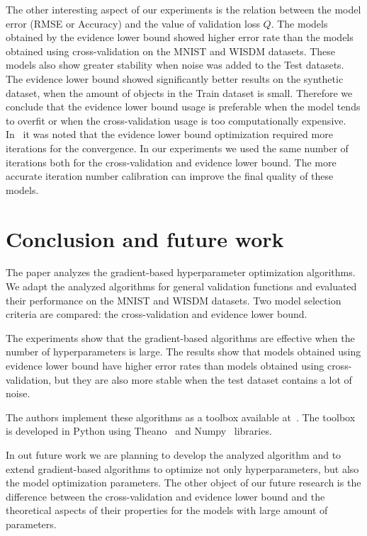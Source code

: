 \documentclass[smallcondensed]{svjour3}
\begin{document}
The other interesting aspect of our experiments is the relation between the model error (RMSE or Accuracy) and the value of validation loss $Q$. The models obtained by the evidence lower bound showed higher error rate than the models obtained using cross-validation on the MNIST and WISDM datasets. These models also show greater stability when noise was added to the Test datasets.  The evidence lower bound showed significantly better results on the synthetic dataset, when the amount of objects in the Train dataset is small. Therefore we conclude that the evidence lower bound usage is preferable when the model tends to overfit or when the cross-validation usage is too computationally expensive.   In~\cite{nips} it was noted that the evidence lower bound optimization required more iterations for the convergence. In our experiments we used the same number of iterations both for the cross-validation and evidence lower bound. The more accurate iteration number calibration can improve the final quality of these models. 

\section{Conclusion and future work}
\label{concl}
The paper analyzes the gradient-based hyperparameter optimization algorithms. We adapt the analyzed algorithms for general validation functions and evaluated their performance on the  MNIST and WISDM datasets. Two model selection criteria are compared: the cross-validation and evidence lower bound. 

The experiments show that the gradient-based algorithms are effective when the number of hyperparameters is large. The results show that models obtained using evidence lower bound have higher error rates than models obtained using cross-validation, but they are also more stable when the test dataset contains a lot of noise. 

The authors  implement these algorithms as a toolbox available at~\cite{pyfos}. The toolbox is developed in Python using Theano~\cite{theano} and Numpy~\cite{numpy} libraries. 

In out future work we are planning to develop the analyzed algorithm and to extend gradient-based algorithms to optimize not only hyperparameters, but also the model optimization parameters. The other object of our future research is the difference between the cross-validation and evidence lower bound and the theoretical aspects of their properties for the models with large amount of parameters.


%

\end{document}
